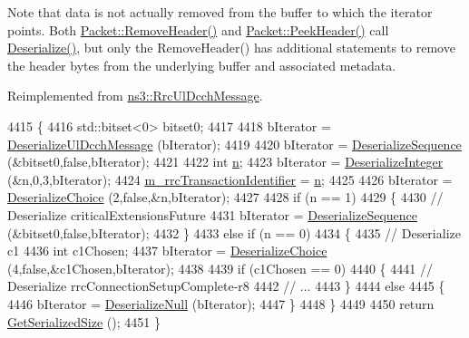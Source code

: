 Note that data is not actually removed from the buffer to which the iterator points. Both \hyperlink{classns3_1_1Packet_a0961eccf975d75f902d40956c93ba63e}{Packet\+::\+Remove\+Header()} and \hyperlink{classns3_1_1Packet_aadc63487bea70945c418f4c3e9b81964}{Packet\+::\+Peek\+Header()} call \hyperlink{classns3_1_1RrcConnectionSetupCompleteHeader_a6af94bc42c6b6de53b39cb78ddd459a8}{Deserialize()}, but only the Remove\+Header() has additional statements to remove the header bytes from the underlying buffer and associated metadata. 

Reimplemented from \hyperlink{classns3_1_1RrcUlDcchMessage_a76f7263f39a6dbb893a42300d4e72e09}{ns3\+::\+Rrc\+Ul\+Dcch\+Message}.


\begin{DoxyCode}
4415 \{
4416   std::bitset<0> bitset0;
4417 
4418   bIterator = \hyperlink{classns3_1_1RrcUlDcchMessage_a11b944acd9ea5a459cc49a9fa11c3161}{DeserializeUlDcchMessage} (bIterator);
4419 
4420   bIterator = \hyperlink{classns3_1_1Asn1Header_a58c68bb97ba3fe2e8fcdd7c208d672b2}{DeserializeSequence} (&bitset0,\textcolor{keyword}{false},bIterator);
4421 
4422   \textcolor{keywordtype}{int} \hyperlink{namespacesample-rng-plot_aeb5ee5c431e338ef39b7ac5431242e1d}{n};
4423   bIterator = \hyperlink{classns3_1_1Asn1Header_a49802c9af30018b078150e866b6ecae2}{DeserializeInteger} (&n,0,3,bIterator);
4424   \hyperlink{classns3_1_1RrcConnectionSetupCompleteHeader_a70eee3bfe3e825bec136553599c32b0d}{m\_rrcTransactionIdentifier} = \hyperlink{namespacesample-rng-plot_aeb5ee5c431e338ef39b7ac5431242e1d}{n};
4425 
4426   bIterator = \hyperlink{classns3_1_1Asn1Header_a0af5881f07a0549a8693a1b75c229a90}{DeserializeChoice} (2,\textcolor{keyword}{false},&n,bIterator);
4427 
4428   \textcolor{keywordflow}{if} (n == 1)
4429     \{
4430       \textcolor{comment}{// Deserialize criticalExtensionsFuture}
4431       bIterator = \hyperlink{classns3_1_1Asn1Header_a58c68bb97ba3fe2e8fcdd7c208d672b2}{DeserializeSequence} (&bitset0,\textcolor{keyword}{false},bIterator);
4432     \}
4433   \textcolor{keywordflow}{else} \textcolor{keywordflow}{if} (n == 0)
4434     \{
4435       \textcolor{comment}{// Deserialize c1}
4436       \textcolor{keywordtype}{int} c1Chosen;
4437       bIterator = \hyperlink{classns3_1_1Asn1Header_a0af5881f07a0549a8693a1b75c229a90}{DeserializeChoice} (4,\textcolor{keyword}{false},&c1Chosen,bIterator);
4438 
4439       \textcolor{keywordflow}{if} (c1Chosen == 0)
4440         \{
4441           \textcolor{comment}{// Deserialize rrcConnectionSetupComplete-r8}
4442           \textcolor{comment}{// ...}
4443         \}
4444       \textcolor{keywordflow}{else}
4445         \{
4446           bIterator = \hyperlink{classns3_1_1Asn1Header_a29bd4508f3f1ef636b3480f524fac0ce}{DeserializeNull} (bIterator);
4447         \}
4448     \}
4449 
4450   \textcolor{keywordflow}{return} \hyperlink{classns3_1_1Asn1Header_a18a67eb7869c5784f59d197bbd76a74f}{GetSerializedSize} ();
4451 \}
\end{DoxyCode}


